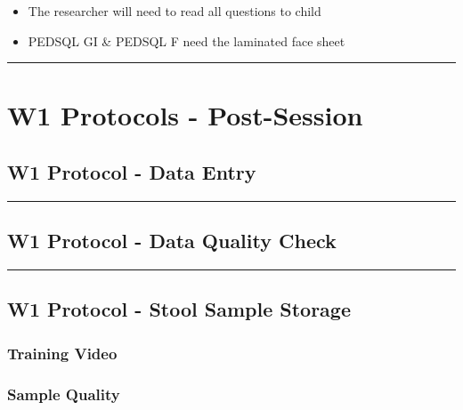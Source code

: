 \documentclass[]{book}
\providecommand{\tightlist}{%
  \setlength{\itemsep}{0pt}\setlength{\parskip}{0pt}}
\begin{document}
\begin{itemize}
\tightlist
\item
  The researcher will need to read all questions to child
\item
  PEDSQL GI \& PEDSQL F need the laminated face sheet
\end{itemize}

\begin{center}\rule{0.5\linewidth}{0.5pt}\end{center}

\hypertarget{w1-protocols---post-session}{%
\section{W1 Protocols - Post-Session}\label{w1-protocols---post-session}}

\hypertarget{w1-protocol---data-entry}{%
\subsection{W1 Protocol - Data Entry}\label{w1-protocol---data-entry}}

\begin{center}\rule{0.5\linewidth}{0.5pt}\end{center}

\hypertarget{w1-protocol---data-quality-check}{%
\subsection{W1 Protocol - Data Quality Check}\label{w1-protocol---data-quality-check}}

\begin{center}\rule{0.5\linewidth}{0.5pt}\end{center}

\hypertarget{w1-protocol---stool-sample-storage}{%
\subsection{W1 Protocol - Stool Sample Storage}\label{w1-protocol---stool-sample-storage}}

\hypertarget{training-video-1}{%
\subsubsection{Training Video}\label{training-video-1}}

\hypertarget{sample-quality}{%
\subsubsection{Sample Quality}\label{sample-quality}}
\end{document}
